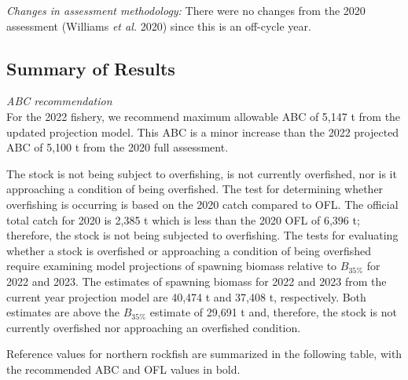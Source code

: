 \documentclass[
  11pt,
]{article}
\begin{document}
\emph{Changes in assessment methodology:} There were no changes from the 2020 assessment (Williams \emph{et al.} 2020) since this is an off-cycle year.

\allsectionsfont{\raggedright}

\hypertarget{summary-of-results}{%
\subsection{Summary of Results}\label{summary-of-results}}

\emph{ABC recommendation}\\
For the 2022 fishery, we recommend maximum allowable ABC of 5,147 t from the updated projection model.
This ABC is a minor increase than the 2022 projected ABC of 5,100 t from the 2020 full assessment.

The stock is not being subject to overfishing, is not currently overfished, nor is it approaching a condition of being overfished.
The test for determining whether overfishing is occurring is based on the 2020 catch compared to OFL.
The official total catch for 2020 is 2,385 t which is less than the 2020 OFL of 6,396 t; therefore, the stock is not being subjected to overfishing.
The tests for evaluating whether a stock is overfished or approaching a condition of being overfished require examining model projections of spawning biomass relative to \(B_{35\%}\) for 2022 and 2023.
The estimates of spawning biomass for 2022 and 2023 from the current year projection model are 40,474 t and 37,408 t, respectively.
Both estimates are above the \(B_{35\%}\) estimate of 29,691 t and, therefore, the stock is not currently overfished nor approaching an overfished condition.

Reference values for northern rockfish are summarized in the following table, with the recommended ABC and OFL values in bold.
\end{document}
